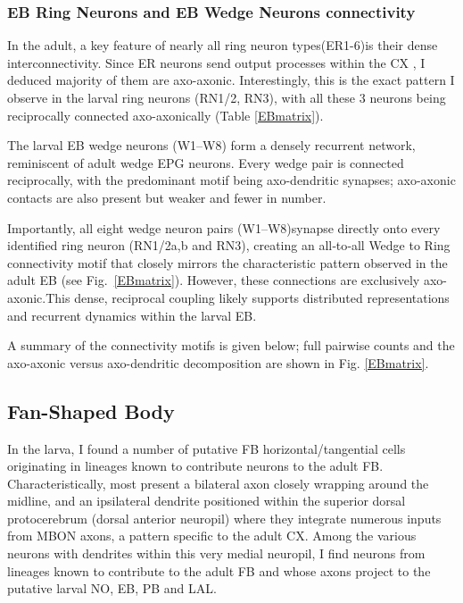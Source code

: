         \subsubsection{EB Ring Neurons and EB Wedge Neurons connectivity}
            In the adult, a key feature of nearly all ring neuron types(ER1-6)is their dense interconnectivity. Since ER neurons send output processes within the CX \citep{hulse2021connectome}, I deduced majority of them are axo-axonic. Interestingly, this is the exact pattern I observe in the larval ring neurons (RN1/2, RN3), with all these 3 neurons being reciprocally connected axo-axonically (Table \ref{EBmatrix}). 

            The larval EB wedge neurons (W1–W8) form a densely recurrent network, reminiscent of adult wedge EPG neurons. Every wedge pair is connected reciprocally, with the predominant motif being axo-dendritic synapses; axo-axonic contacts are also present but weaker and fewer in number. 

            Importantly, all eight wedge neuron pairs (W1–W8)synapse directly onto every identified ring neuron (RN1/2a,b and RN3), creating an all‑to‑all Wedge to Ring connectivity motif that closely mirrors the characteristic pattern observed in the adult EB (see Fig.~\ref{EBmatrix}). However, these connections are exclusively axo-axonic.This dense, reciprocal coupling likely supports distributed representations and recurrent dynamics within the larval EB. 

            A summary of the connectivity motifs is given below; full pairwise counts and the axo-axonic versus axo-dendritic decomposition are shown in Fig. \ref{EBmatrix}. 

    \subsection{Fan-Shaped Body}
        In the larva, I found a number of putative FB horizontal/tangential cells originating in lineages known to contribute neurons to the adult FB. Characteristically, most present a bilateral axon closely wrapping around the midline, and an ipsilateral dendrite positioned within the superior dorsal protocerebrum (dorsal anterior neuropil) where they integrate numerous inputs from MBON axons, a pattern specific to the adult CX. Among the various neurons with dendrites within this very medial neuropil, I find neurons from lineages known to contribute to the adult FB and whose axons project to the putative larval NO, EB, PB and LAL.
